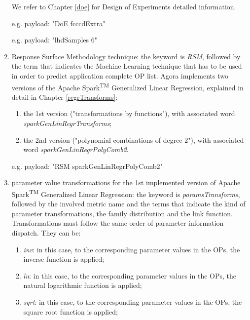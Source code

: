 \begin{enumerate}
    We refer to Chapter \ref{doe} for Design of Experiments detailed information.
    
    e.g. payload: "DoE fcccdExtra"
    
    e.g. payload: "lhdSamples 6"
    
    \item Response Surface Methodology technique: the keyword is \textit{RSM}, followed by the term that indicates the Machine Learning technique that has to be used in order to predict application complete OP list. Agora implements two versions of the Apache Spark\textsuperscript{TM} Generalized Linear Regression, explained in detail in Chapter \ref{regrTransforms}:
    
    \begin{enumerate}
    
        \item the 1st version ("transformations by functions"), with associated word \textit{sparkGenLinRegrTransforms};
        
        \item the 2nd version ("polynomial combinations of degree 2"), with associated word \textit{sparkGenLinRegrPolyComb2}.
    
    \end{enumerate}
    
    e.g. payload: "RSM sparkGenLinRegrPolyComb2"
    
    \item parameter value transformations for the 1st implemented version of Apache Spark\textsuperscript{TM} Generalized Linear Regression: the keyword is \textit{paramsTransforms}, followed by the involved metric name and the terms that indicate the kind of parameter transformations, the family distribution and the link function. Transformations must follow the same order of parameter information dispatch. They can be:
    
    \begin{enumerate}
    
        \item \textit{inv}: in this case, to the corresponding parameter values in the OPs, the inverse function is applied;
        
        \item \textit{ln}: in this case, to the corresponding parameter values in the OPs, the natural logarithmic function is applied;
        
        \item \textit{sqrt}: in this case, to the corresponding parameter values in the OPs, the square root function is applied;
        

\end{enumerate}
\end{enumerate}
